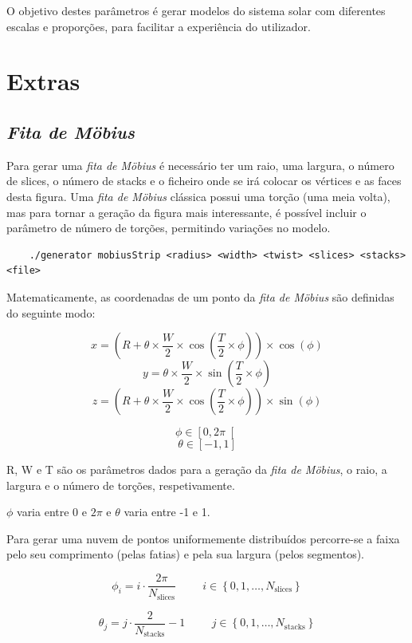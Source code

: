 \documentclass[12pt, a4paper]{article}
\begin{document}
O objetivo destes parâmetros é gerar modelos do sistema solar com diferentes escalas e
proporções, para facilitar a experiência do utilizador.

\section{Extras}

\subsection{\emph{Fita de Möbius}}

Para gerar uma \emph{fita de Möbius} é necessário ter um raio, uma largura, o número de slices,
o número de stacks e o ficheiro onde se irá colocar os vértices e as faces desta figura.
Uma \emph{fita de Möbius} clássica possui uma torção (uma meia volta), mas para tornar a geração
da figura mais interessante, é possível incluir o parâmetro de número de torções, permitindo
variações no modelo.
\begin{verbatim}
    ./generator mobiusStrip <radius> <width> <twist> <slices> <stacks> <file>
\end{verbatim}

Matematicamente, as coordenadas de um ponto da \emph{fita de Möbius} são definidas do seguinte modo:

$$x = (R + \theta \times \frac{W}{2} \times \cos (\frac{T}{2} \times \phi)) \times
\cos (\phi)$$
$$y = \theta \times \frac{W}{2} \times \sin (\frac{T}{2} \times \phi)$$
$$z = (R + \theta \times \frac{W}{2} \times \cos (\frac{T}{2} \times \phi)) \times
\sin (\phi)$$

$$\phi \in \left [ 0, 2 \pi \right [$$
$$\theta \in \left [ -1, 1 \right ]$$

R, W e T são os parâmetros dados para a geração da \emph{fita de Möbius}, o raio, a
largura e o número de torções, respetivamente.

$\phi$ varia entre 0 e $2 \pi$ e $\theta$ varia entre -1 e 1.

Para gerar uma nuvem de pontos uniformemente distribuídos percorre-se a faixa pelo seu comprimento
(pelas fatias) e pela sua largura (pelos segmentos).

$$
\phi_i = i \cdot \frac{2\pi}{N_\text{slices}}
\hspace{1cm}
i \in \left \lbrace 0, 1, \ldots, N_\text{slices} \right \rbrace
$$

$$
\theta_j = j \cdot \frac{2}{N_\text{stacks}} -1
\hspace{1cm}
j \in \left \lbrace 0, 1, \ldots, N_\text{stacks} \right \rbrace
$$
\end{document}
